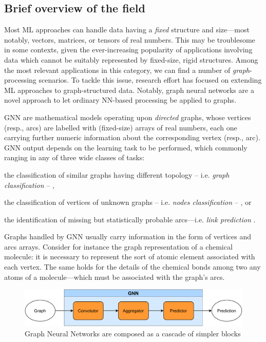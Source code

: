 \documentclass[12pt,a4paper,openright,twoside]{book}
\begin{document}
\subsection{Brief overview of the field}

Most ML approaches can handle data having a \emph{fixed} structure and size---most notably, vectors, matrices, or tensors of real numbers.
%
This may be troublesome in some contexts, given the ever-increasing popularity of applications involving data which cannot be suitably represented by fixed-size, rigid structures.
%
Among the most relevant applications in this category, we can find a number of \emph{graph}-processing scenarios.
%
To tackle this issue, research effort has focused on extending ML approaches to graph-structured data.
%
Notably, graph neural networks \cite{WuNeuralnetworkslearningsystems2021} are a novel approach to let ordinary NN-based processing be applied to graphs.

GNN are mathematical models operating upon \emph{directed} graphs, whose vertices (resp., arcs) are labelled with (fixed-size) arrays of real numbers, each one carrying further numeric information about the corresponding vertex (resp., arc).
%
GNN output depends on the learning task to be performed, which commonly ranging in any of three wide classes of tasks:
%
\begin{inlinelist}
    \item the classification of similar graphs having different topology -- i.e. \emph{graph classification} -- \cite{ShuiIcdm2020},
    \item the classification of vertices of unknown graphs  -- i.e. \emph{nodes classification} -- \cite{WangCorr2020}, or
    \item the identification of missing but statistically probable arcs---i.e. \emph{link prediction} \cite{FanWww2019}.
\end{inlinelist}

Graphs handled by GNN usually carry information in the form of vertices and arcs arrays.
%
Consider for instance the graph representation of a chemical molecule: it is necessary to represent the sort of atomic element associated with each vertex.
%
The same holds for the details of the chemical bonds among two any atoms of a molecule---which must be associated with the graph's arcs.

\begin{figure}
    \centering
    \includegraphics[width=.8\linewidth]{figures/gnn_workflow_1.pdf}
    \caption{Graph Neural Networks are composed as a cascade of simpler blocks}
    \label{fig:gnn_blocks_1}
\end{figure}
\end{document}
